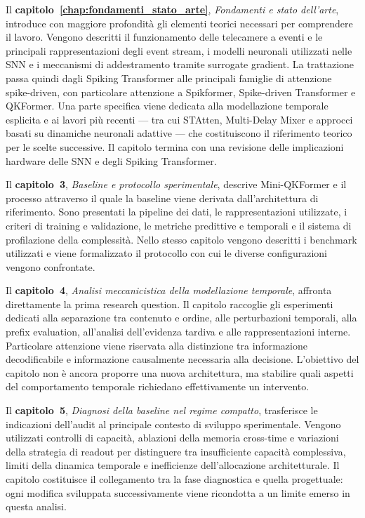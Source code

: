 Il \textbf{capitolo~\ref{chap:fondamenti_stato_arte}}, \emph{Fondamenti e stato dell'arte}, introduce con maggiore profondità gli elementi teorici necessari per comprendere il lavoro. Vengono descritti il funzionamento delle telecamere a eventi e le principali rappresentazioni degli event stream, i modelli neuronali utilizzati nelle SNN e i meccanismi di addestramento tramite surrogate gradient. La trattazione passa quindi dagli Spiking Transformer alle principali famiglie di attenzione spike-driven, con particolare attenzione a Spikformer, Spike-driven Transformer e QKFormer. Una parte specifica viene dedicata alla modellazione temporale esplicita e ai lavori più recenti --- tra cui STAtten, Multi-Delay Mixer e approcci basati su dinamiche neuronali adattive --- che costituiscono il riferimento teorico per le scelte successive. Il capitolo termina con una revisione delle implicazioni hardware delle SNN e degli Spiking Transformer.

Il \textbf{capitolo~3}, \emph{Baseline e protocollo sperimentale}, descrive Mini-QKFormer e il processo attraverso il quale la baseline viene derivata dall'architettura di riferimento. Sono presentati la pipeline dei dati, le rappresentazioni utilizzate, i criteri di training e validazione, le metriche predittive e temporali e il sistema di profilazione della complessità. Nello stesso capitolo vengono descritti i benchmark utilizzati e viene formalizzato il protocollo con cui le diverse configurazioni vengono confrontate.

Il \textbf{capitolo~4}, \emph{Analisi meccanicistica della modellazione temporale}, affronta direttamente la prima research question. Il capitolo raccoglie gli esperimenti dedicati alla separazione tra contenuto e ordine, alle perturbazioni temporali, alla prefix evaluation, all'analisi dell'evidenza tardiva e alle rappresentazioni interne. Particolare attenzione viene riservata alla distinzione tra informazione decodificabile e informazione causalmente necessaria alla decisione. L'obiettivo del capitolo non è ancora proporre una nuova architettura, ma stabilire quali aspetti del comportamento temporale richiedano effettivamente un intervento.

Il \textbf{capitolo~5}, \emph{Diagnosi della baseline nel regime compatto}, trasferisce le indicazioni dell'audit al principale contesto di sviluppo sperimentale. Vengono utilizzati controlli di capacità, ablazioni della memoria cross-time e variazioni della strategia di readout per distinguere tra insufficiente capacità complessiva, limiti della dinamica temporale e inefficienze dell'allocazione architetturale. Il capitolo costituisce il collegamento tra la fase diagnostica e quella progettuale: ogni modifica sviluppata successivamente viene ricondotta a un limite emerso in questa analisi.

